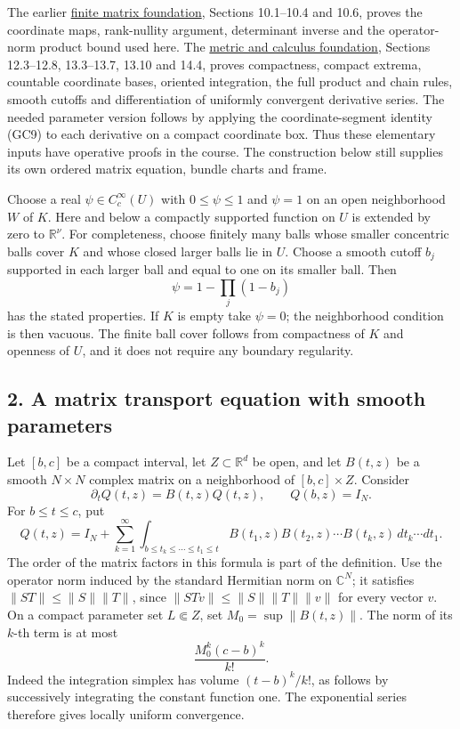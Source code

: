 \documentclass[
  11pt,
]{article}
\begin{document}
The earlier \href{stable-prerequisite-bridges.pdf}{finite matrix
foundation}, Sections 10.1--10.4 and 10.6, proves the coordinate maps,
rank-nullity argument, determinant inverse and the operator-norm product
bound used here. The \href{metric-foundation-bridges.pdf}{metric and
calculus foundation}, Sections 12.3--12.8, 13.3--13.7, 13.10 and 14.4,
proves compactness, compact extrema, countable coordinate bases,
oriented integration, the full product and chain rules, smooth cutoffs
and differentiation of uniformly convergent derivative series. The
needed parameter version follows by applying the coordinate-segment
identity (GC9) to each derivative on a compact coordinate box. Thus
these elementary inputs have operative proofs in the course. The
construction below still supplies its own ordered matrix equation,
bundle charts and frame.

Choose a real \(\psi\in C_c^\infty(U)\) with \(0\leq\psi\leq1\) and
\(\psi=1\) on an open neighborhood \(W\) of \(K\). Here and below a
compactly supported function on \(U\) is extended by zero to
\(\mathbb R^\nu\). For completeness, choose finitely many balls whose
smaller concentric balls cover \(K\) and whose closed larger balls lie
in \(U\). Choose a smooth cutoff \(b_j\) supported in each larger ball
and equal to one on its smaller ball. Then \[
\psi=1-\prod_j(1-b_j)
\tag{M5}
\] has the stated properties. If \(K\) is empty take \(\psi=0\); the
neighborhood condition is then vacuous. The finite ball cover follows
from compactness of \(K\) and openness of \(U\), and it does not require
any boundary regularity.

\subsection{2. A matrix transport equation with smooth
parameters}\label{a-matrix-transport-equation-with-smooth-parameters}

Let \([b,c]\) be a compact interval, let \(Z\subset\mathbb R^d\) be
open, and let \(B(t,z)\) be a smooth \(N\times N\) complex matrix on a
neighborhood of \([b,c]\times Z\). Consider \[
\partial_t Q(t,z)=B(t,z)Q(t,z),\qquad Q(b,z)=I_N.
\tag{M6}
\] For \(b\leq t\leq c\), put \[
Q(t,z)=I_N+\sum_{k=1}^{\infty}
\int_{b\leq t_k\leq\cdots\leq t_1\leq t}
B(t_1,z)B(t_2,z)\cdots B(t_k,z)
\,dt_k\cdots dt_1.
\tag{M7}
\] The order of the matrix factors in this formula is part of the
definition. Use the operator norm induced by the standard Hermitian norm
on \(\mathbb C^N\); it satisfies \(\|ST\|\leq\|S\|\|T\|\), since
\(\|STv\|\leq\|S\|\|T\|\|v\|\) for every vector \(v\). On a compact
parameter set \(L\Subset Z\), set \(M_0=\sup\|B(t,z)\|\). The norm of
its \(k\)-th term is at most \[
\frac{M_0^k(c-b)^k}{k!}.
\tag{M8}
\] Indeed the integration simplex has volume \((t-b)^k/k!\), as follows
by successively integrating the constant function one. The exponential
series therefore gives locally uniform convergence.
\end{document}
